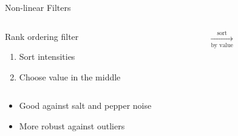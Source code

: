 \subtitle{Image Processing -- Non-linear Methods}
\frame[plain,c]{\titlepage}

\begin{frame}[t]{Non-linear Filters}
    \begin{columns}[T, onlytextwidth]
        \begin{column}{0.4\textwidth}
            {}

            Rank ordering filter\bigskip
            \begin{enumerate}
                \item Sort intensities
                \item Choose value in the middle
            \end{enumerate}
        \end{column}%
        \begin{column}{0.5\textwidth}
            \quad%
            $\xrightarrow[\text{by value}]{\text{sort}}$\quad%
            \quad%
        \end{column}
    \end{columns}
    \vspace{-4.5\bigskipamount}
    {}
    \begin{itemize}
        \item Good against salt and pepper noise
        \item More robust against outliers
    \end{itemize}
\end{frame}

